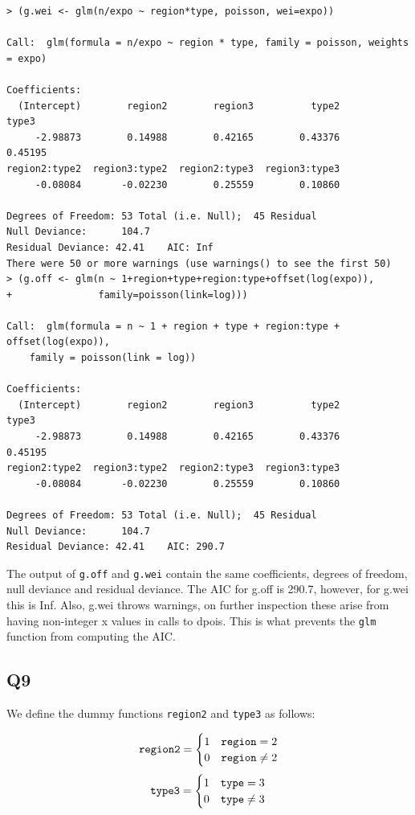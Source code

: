 \documentclass[11pt]{article}
\begin{document}
\begin{verbatim}
> (g.wei <- glm(n/expo ~ region*type, poisson, wei=expo))

Call:  glm(formula = n/expo ~ region * type, family = poisson, weights = expo)

Coefficients:
  (Intercept)        region2        region3          type2          type3
     -2.98873        0.14988        0.42165        0.43376        0.45195
region2:type2  region3:type2  region2:type3  region3:type3  
     -0.08084       -0.02230        0.25559        0.10860  

Degrees of Freedom: 53 Total (i.e. Null);  45 Residual
Null Deviance:	    104.7 
Residual Deviance: 42.41 	AIC: Inf
There were 50 or more warnings (use warnings() to see the first 50)
> (g.off <- glm(n ~ 1+region+type+region:type+offset(log(expo)),
+               family=poisson(link=log)))

Call:  glm(formula = n ~ 1 + region + type + region:type + offset(log(expo)), 
    family = poisson(link = log))

Coefficients:
  (Intercept)        region2        region3          type2          type3
     -2.98873        0.14988        0.42165        0.43376        0.45195
region2:type2  region3:type2  region2:type3  region3:type3  
     -0.08084       -0.02230        0.25559        0.10860  

Degrees of Freedom: 53 Total (i.e. Null);  45 Residual
Null Deviance:	    104.7 
Residual Deviance: 42.41 	AIC: 290.7
\end{verbatim}

The output of \verb|g.off| and \verb|g.wei| contain the same coefficients, degrees of freedom, null deviance and residual deviance.
The AIC for g.off is 290.7, however, for g.wei this is Inf. Also, g.wei throws warnings, on further inspection these arise from having non-integer x values in calls to dpois. This is what prevents the \verb|glm| function from computing the AIC.

\subsection*{Q9}

We define the dummy functions \verb|region2| and \verb|type3| as follows:

\begin{equation}
\verb|region2| = 
\begin{cases}
	1 & \verb|region| = 2 \\
	0 & \verb|region| \neq 2
\end{cases}
\end{equation}
\begin{equation}
\verb|type3| = 
\begin{cases}
1 & \verb|type| = 3 \\
0 & \verb|type| \neq 3
\end{cases}
\end{equation}
\end{document}
